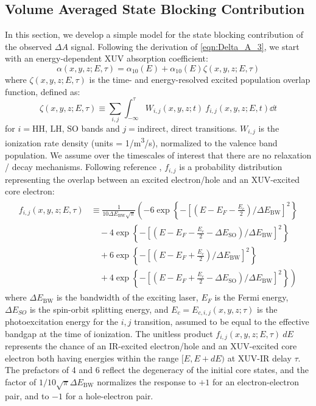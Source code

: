 \subsection{Volume Averaged State Blocking Contribution}
In this section, we develop a simple model for the state blocking contribution of the observed $\Delta A$ signal. Following the derivation of \cref{eqn:Delta_A_3}, we start with an energy-dependent XUV absorption coefficient:
\begin{equation}
\alpha(x, y, z; E, \tau) = \alpha_{10}(E) + \alpha_{10}(E) \zeta(x, y, z; E, \tau)
\end{equation}
where $\zeta(x, y, z; E, \tau)$ is the time- and energy-resolved excited population overlap function, defined as:
\begin{equation}
\zeta(x, y, z; E, \tau) \equiv \sum_{i,j} \int_{-\infty}^{\tau} W_{i,j}(x, y, z; t) \ f_{i,j}(x, y, z; E, t) \dd{t}
\end{equation}
for $i=\textrm{HH, LH, SO}$ bands and $j=\textrm{indirect, direct}$ transitions. $W_{i,j}$ is the ionization rate density (units = 1/m\textsuperscript{3}/s), normalized to the valence band population. We assume over the timescales of interest that there are no relaxation / decay mechanisms. Following reference \cite{zurchDirectSimultaneousObservation2017}, $f_{i,j}$ is a probability distribution representing the overlap between an excited electron/hole and an XUV-excited core electron:
\begin{align}
\begin{split}
f_{i,j}(x, y, z; E, \tau) &\equiv \frac{1}{10 \Delta E_{\textrm{BW}} \sqrt{\pi}} \left( -6 \exp \left\{- \left[ \left(E-E_F-\frac{E_c}{2} \right)/\Delta E_{\textrm{BW}} \right]^2 \right\} \right. \\
&\quad - 4 \exp \left\{- \left[ \left(E-E_F-\frac{E_c}{2}-\Delta E_{\textrm{SO}} \right)/\Delta E_{\textrm{BW}} \right]^2 \right\} \\
&\quad + 6 \exp \left\{- \left[ \left(E-E_F+\frac{E_c}{2} \right)/\Delta E_{\textrm{BW}} \right]^2 \right\} \\
&\left. \quad + 4 \exp \left\{- \left[ \left(E-E_F+\frac{E_c}{2}-\Delta E_{\textrm{SO}} \right)/\Delta E_{\textrm{BW}} \right]^2 \right\} \right)
\end{split}
\label{eqn:f_ij}
\end{align}
where $\Delta E_{\textrm{BW}}$ is the bandwidth of the exciting laser, $E_F$ is the Fermi energy, $\Delta E_{SO}$ is the spin-orbit splitting energy, and $E_c = E_{c,i,j}(x, y, z; \tau)$ is the photoexcitation energy for the $i,j$ transition, assumed to be equal to the effective bandgap at the time of ionization. The unitless product $f_{i,j}(x,y,z;E,\tau) \ dE$ represents the chance of an IR-excited electron/hole and an XUV-excited core electron both having energies within the range $[E, E+ dE)$ at XUV-IR delay $\tau$. The prefactors of 4 and 6 reflect the degeneracy of the initial core states, and the factor of $1 / 10 \sqrt{\pi} \Delta E_{\textrm{BW}}$ normalizes the response to $+1$ for an electron-electron pair, and to $-1$ for a hole-electron pair.

